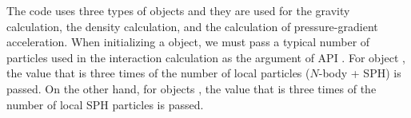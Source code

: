 The code uses three types of \tree objects and they are used for the gravity calculation, the density calculation, and the calculation of pressure-gradient acceleration. When initializing a \tree object, we must pass a typical number of particles used in the interaction calculation as the  argument of API . For \tree object , the value that is three times of the number of local particles ($N$-body + SPH) is passed. On the other hand, for \tree objects , the value that is three times of the number of local SPH particles is passed.

